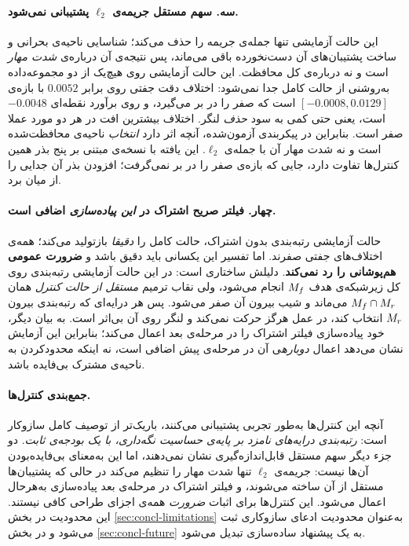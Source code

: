 \paragraph{سه. سهم مستقل جریمه‌ی $\ell_2$ پشتیبانی نمی‌شود.} این حالت آزمایشی تنها جمله‌ی جریمه را حذف می‌کند؛ شناسایی ناحیه‌ی بحرانی و ساخت پشتیبان‌های آن دست‌نخورده باقی می‌ماند، پس نتیجه‌ی آن درباره‌ی \emph{شدت مهار} است و نه درباره‌ی کل محافظت. این حالت آزمایشی روی هیچ‌یک از دو مجموعه‌داده به‌روشنی از حالت کامل جدا نمی‌شود: اختلاف دقت جفتی روی  برابر $0.0052$ با بازه‌ی $[-0.0008,0.0129]$ است که صفر را در بر می‌گیرد، و روی  برآورد نقطه‌ای $-0.0048$ است، یعنی حتی کمی به سود \emph{حذف} لنگر. اختلاف بیشترین افت در هر دو مورد عملا صفر است. بنابراین در پیکربندی آزمون‌شده، آنچه اثر دارد \emph{انتخاب} ناحیه‌ی محافظت‌شده است و نه شدت مهار آن با جمله‌ی $\ell_2$. این یافته با نسخه‌ی مبتنی بر پنج بذر همین کنترل‌ها تفاوت دارد، جایی که بازه‌ی  صفر را در بر نمی‌گرفت؛ افزودن بذر آن جدایی را از میان برد.

\paragraph{چهار. فیلتر صریح اشتراک در \emph{این پیاده‌سازی} اضافی است.} حالت آزمایشی رتبه‌بندی بدون اشتراک، حالت کامل را \emph{دقیقا} بازتولید می‌کند؛ همه‌ی اختلاف‌های جفتی صفرند. اما تفسیر این یکسانی باید دقیق باشد و \textbf{ضرورت عمومی هم‌پوشانی را رد نمی‌کند}. دلیلش ساختاری است: در این حالت آزمایشی رتبه‌بندی روی کل زیرشبکه‌ی هدف $M_f$ انجام می‌شود، ولی نقاب ترمیم \emph{مستقل از حالت کنترل} همان $M_f\cap M_r$ می‌ماند و شیب بیرون آن صفر می‌شود. پس هر درایه‌ای که رتبه‌بندی بیرون $M_r$ انتخاب کند، در عمل هرگز حرکت نمی‌کند و لنگر روی آن بی‌اثر است. به بیان دیگر، خود پیاده‌سازی فیلتر اشتراک را در مرحله‌ی بعد اعمال می‌کند؛ بنابراین این آزمایش نشان می‌دهد اعمال \emph{دوباره}ی آن در مرحله‌ی پیش اضافی است، نه اینکه محدودکردن به ناحیه‌ی مشترک بی‌فایده باشد.

\paragraph{جمع‌بندی کنترل‌ها.} آنچه این کنترل‌ها به‌طور تجربی پشتیبانی می‌کنند، باریک‌تر از توصیف کامل سازوکار است: \emph{رتبه‌بندی درایه‌های نامزد بر پایه‌ی حساسیت نگه‌داری، با یک بودجه‌ی ثابت}. دو جزء دیگر سهم مستقل قابل‌اندازه‌گیری نشان نمی‌دهند، اما این به‌معنای بی‌فایده‌بودن آن‌ها نیست: جریمه‌ی $\ell_2$ تنها شدت مهار را تنظیم می‌کند در حالی که پشتیبان‌ها مستقل از آن ساخته می‌شوند، و فیلتر اشتراک در مرحله‌ی بعد پیاده‌سازی به‌هرحال اعمال می‌شود. این کنترل‌ها برای اثبات \emph{ضرورت} همه‌ی اجزای طراحی کافی نیستند. این محدودیت در بخش \ref{sec:concl-limitations} به‌عنوان محدودیت ادعای سازوکاری ثبت می‌شود و در بخش \ref{sec:concl-future} به یک پیشنهاد ساده‌سازی تبدیل می‌شود.

